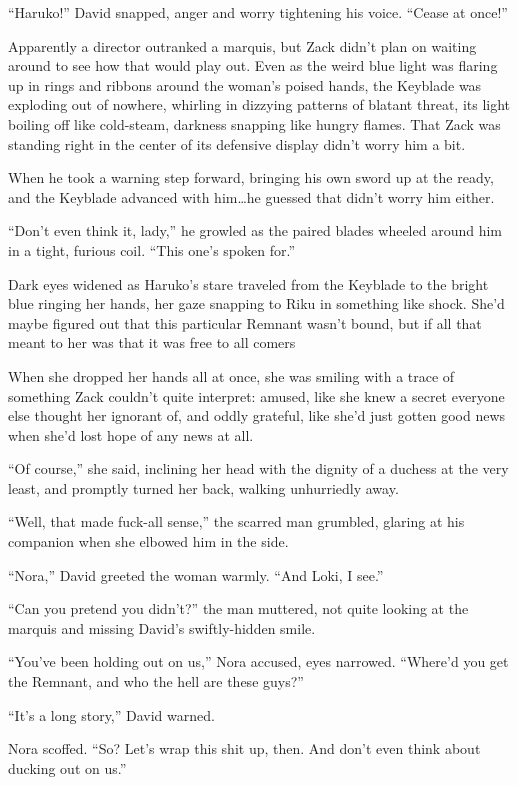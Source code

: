 ``Haruko!'' David snapped, anger and worry tightening his voice. ``Cease at once!''

Apparently a director outranked a marquis, but Zack didn't plan on waiting around to see how that would play out. Even as the weird blue light was flaring up in rings and ribbons around the woman's poised hands, the Keyblade was exploding out of nowhere, whirling in dizzying patterns of blatant threat, its light boiling off like cold-steam, darkness snapping like hungry flames. That Zack was standing right in the center of its defensive display didn't worry him a bit.

When he took a warning step forward, bringing his own sword up at the ready, and the Keyblade advanced with him\ldots he guessed that didn't worry him either.

``Don't even think it, lady,'' he growled as the paired blades wheeled around him in a tight, furious coil. ``This one's spoken for.''

Dark eyes widened as Haruko's stare traveled from the Keyblade to the bright blue ringing her hands, her gaze snapping to Riku in something like shock. She'd maybe figured out that this particular Remnant wasn't bound, but if all that meant to her was that it was free to all comers\textemdash 

When she dropped her hands all at once, she was smiling with a trace of something Zack couldn't quite interpret: amused, like she knew a secret everyone else thought her ignorant of, and oddly grateful, like she'd just gotten good news when she'd lost hope of any news at all.

``Of course,'' she said, inclining her head with the dignity of a duchess at the very least, and promptly turned her back, walking unhurriedly away.

``Well, that made fuck-all sense,'' the scarred man grumbled, glaring at his companion when she elbowed him in the side.

``Nora,'' David greeted the woman warmly. ``And Loki, I see.''

``Can you pretend you didn't?'' the man muttered, not quite looking at the marquis and missing David's swiftly-hidden smile.

``You've been holding out on us,'' Nora accused, eyes narrowed. ``Where'd you get the Remnant, and who the hell are these guys?''

``It's a long story,'' David warned.

Nora scoffed. ``So? Let's wrap this shit up, then. And don't even think about ducking out on us.''

